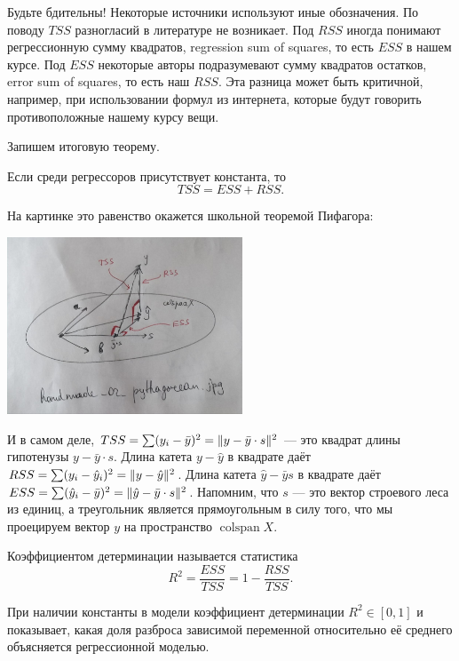 \documentclass[12pt]{article}
\DeclareMathOperator{\colspan}{colspan}
\DeclarePairedDelimiter{\norm}{\lVert}{\rVert}
\newcommand{\hy}{\hat{y}}
\newcommand{\RSS}{RSS}
\newcommand{\ESS}{ESS}
\newcommand{\TSS}{TSS}
\begin{document}
Будьте бдительны! 
Некоторые источники используют иные обозначения. 
По поводу $\TSS$ разногласий в литературе не возникает. 
Под $\RSS$ иногда понимают регрессионную сумму квадратов, regression sum of squares, то есть $\ESS$ в нашем курсе. 
Под $\ESS$ некоторые авторы подразумевают сумму квадратов остатков, error sum of squares, то есть наш $\RSS$. 
Эта разница может быть критичной, например, при использовании формул из интернета, которые будут говорить противоположные нашему курсу вещи.

Запишем итоговую теорему.
\begin{theorem}
Если среди регрессоров присутствует константа, то
\[
\label{tss}
    \TSS = \ESS + \RSS.
\]
\end{theorem}


На картинке это равенство окажется школьной теоремой Пифагора:

\begin{minipage}{\textwidth}
\includegraphics[width=7cm]{handmade/handmade_02_pythagorean.jpg}
\end{minipage}


И в самом деле, $\TSS = \sum (y_i - \bar y)^2 = \norm{y - \bar y\cdot s}^2$ — это квадрат длины гипотенузы $y - \bar y \cdot s$.
Длина катета $y - \hat y$ в квадрате даёт $\RSS = \sum(y_i - \hy_i)^2 = \norm{y - \hy}^2$.
Длина катета $\hy - \bar y s$ в квадрате даёт $\ESS = \sum(\hy_i - \bar y)^2 = \norm{\hy - \bar y \cdot s}^2$.
Напомним, что $s$ — это вектор строевого леса из единиц,
а треугольник является прямоугольным в силу того, что мы проецируем вектор $y$ на пространство $\colspan X$.




\begin{definition}
Коэффициентом детерминации называется статистика 
\[
R^2 = \frac{\ESS}{\TSS} = 1 - \frac{\RSS}{\TSS}.
\]    
\end{definition}

При наличии константы в модели коэффициент детерминации $R^2 \in [0,1]$ и показывает, какая доля разброса зависимой переменной относительно её среднего объясняется регрессионной моделью.
\end{document}
